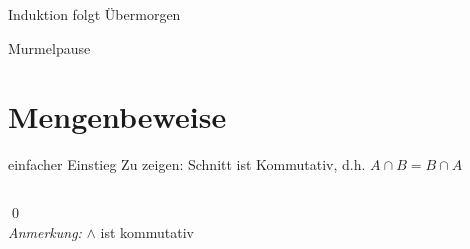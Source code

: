 \documentclass[10pt]{beamer}
\begin{document}
\begin{frame}[standout]
  Induktion folgt Übermorgen
\end{frame}

\begin{frame}[standout]
    Murmelpause
\end{frame}


\section{Mengenbeweise}

\begin{frame}{einfacher Einstieg}
        \onslide
            Zu zeigen: Schnitt ist Kommutativ, d.h. $A \cap B = B \cap A$
        \begin{columns}
        \end{columns}
        \qed\\
    \small{\emph{Anmerkung:} $\wedge$ ist kommutativ}
\end{frame}
\end{document}
